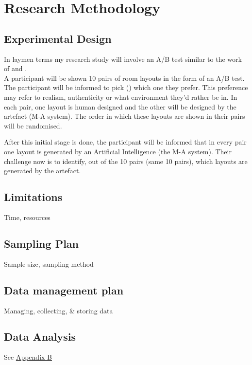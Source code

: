 \section{Research Methodology}

\subsection{Experimental Design}
In laymen terms my research study will involve an A/B test similar to the work of  \cite{constrained-layouts} and  \cite{make-it-home}.
\\
A participant will be shown 10 pairs of room layouts in the form of an A/B test. The participant will be informed to pick () which one they prefer.
This preference may refer to realism, authenticity or what environment they'd rather be in. In each pair, one layout is human designed and the other will be designed by the artefact (M-A system). The order in which these layouts are shown in their pairs will be randomised.

After this initial stage is done, the participant will be informed that in every pair one layout is generated by an Artificial Intelligence (the M-A system). Their challenge now is to identify, out of the 10 pairs (same 10 pairs), which layouts are generated by the artefact.

\subsection{Limitations}
Time, resources

\subsection{Sampling Plan}
Sample size, sampling method

\subsection{Data management plan}
Managing, collecting, \& storing data

\subsection{Data Analysis}
See \hyperref[append:b]{Appendix B}

